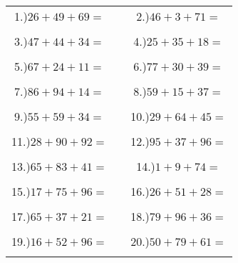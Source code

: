 \documentclass{article}
\begin{document}
\begin{tabular}{ccc}
1.)$26+49+69=$& \hspace{5cm} &2.)$46+3+71=$\\\\
3.)$47+44+34=$& \hspace{5cm} &4.)$25+35+18=$\\\\
5.)$67+24+11=$& \hspace{5cm} &6.)$77+30+39=$\\\\
7.)$86+94+14=$& \hspace{5cm} &8.)$59+15+37=$\\\\
9.)$55+59+34=$& \hspace{5cm} &10.)$29+64+45=$\\\\
11.)$28+90+92=$& \hspace{5cm} &12.)$95+37+96=$\\\\
13.)$65+83+41=$& \hspace{5cm} &14.)$1+9+74=$\\\\
15.)$17+75+96=$& \hspace{5cm} &16.)$26+51+28=$\\\\
17.)$65+37+21=$& \hspace{5cm} &18.)$79+96+36=$\\\\
19.)$16+52+96=$& \hspace{5cm} &20.)$50+79+61=$\\\\
\end{tabular}
\newpage
\end{document}
